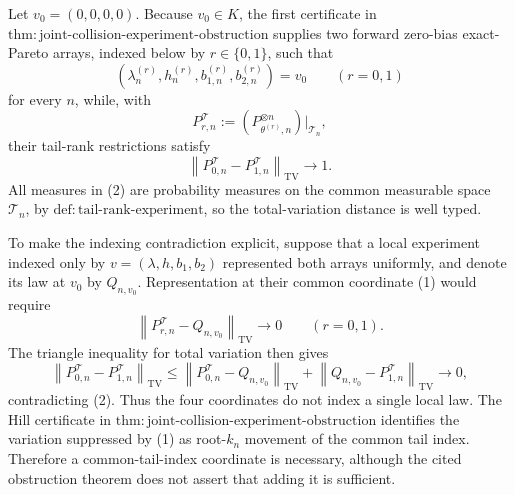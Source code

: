 Let \(v_0=(0,0,0,0)\).  Because \(v_0\in K\), the first certificate in \(\mathrm{thm{:}joint\text{-}collision\text{-}experiment\text{-}obstruction}\) supplies two forward zero-bias exact-Pareto arrays, indexed below by \(r\in\{0,1\}\), such that
\[
 (\lambda_n^{(r)},h_n^{(r)},b_{1,n}^{(r)},b_{2,n}^{(r)})=v_0
 \qquad(r=0,1)
 \tag{1}
\]
for every \(n\), while, with
\[
 P_{r,n}^{\mathcal T}
 :=(P_{\theta^{(r)},n}^{\otimes n})\big|_{\mathcal T_n},
\]
their tail-rank restrictions satisfy
\[
 \left\|P_{0,n}^{\mathcal T}-P_{1,n}^{\mathcal T}\right\|_{\mathrm{TV}}
 \longrightarrow1.
 \tag{2}
\]
All measures in (2) are probability measures on the common measurable space \(\mathcal T_n\), by \(\mathrm{def{:}tail\text{-}rank\text{-}experiment}\), so the total-variation distance is well typed.

To make the indexing contradiction explicit, suppose that a local experiment indexed only by \(v=(\lambda,h,b_1,b_2)\) represented both arrays uniformly, and denote its law at \(v_0\) by \(Q_{n,v_0}\).  Representation at their common coordinate (1) would require
\[
 \left\|P_{r,n}^{\mathcal T}-Q_{n,v_0}\right\|_{\mathrm{TV}}
 \longrightarrow0
 \qquad(r=0,1).
 \tag{3}
\]
The triangle inequality for total variation then gives
\[
 \left\|P_{0,n}^{\mathcal T}-P_{1,n}^{\mathcal T}\right\|_{\mathrm{TV}}
 \leq
 \left\|P_{0,n}^{\mathcal T}-Q_{n,v_0}\right\|_{\mathrm{TV}}
 +
 \left\|Q_{n,v_0}-P_{1,n}^{\mathcal T}\right\|_{\mathrm{TV}}
 \longrightarrow0,
 \tag{4}
\]
contradicting (2).  Thus the four coordinates do not index a single local law.  The Hill certificate in \(\mathrm{thm{:}joint\text{-}collision\text{-}experiment\text{-}obstruction}\) identifies the variation suppressed by (1) as root-\(k_n\) movement of the common tail index.  Therefore a common-tail-index coordinate is necessary, although the cited obstruction theorem does not assert that adding it is sufficient.

